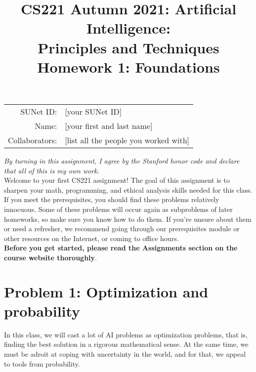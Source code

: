 \documentclass{article}
\title{\textbf{CS221 Autumn 2021: Artificial Intelligence:\\ Principles and Techniques} \\Homework 1: Foundations}
\date{}
\theoremstyle{case}
\theoremstyle{definition}
\begin{document}
\maketitle

\begin{center}
\begin{tabular}{rl}
SUNet ID: & [your SUNet ID] \\
Name: & [your first and last name] \\
Collaborators: & [list all the people you worked with]
\end{tabular}
\end{center}

\textit{By turning in this assignment, I agree by the Stanford honor code and declare
that all of this is my own work.} \\

Welcome to your first CS221 assignment! The goal of this assignment is to sharpen your math, programming, and ethical analysis skills needed for this class. If you meet the prerequisites, you should find these problems relatively innocuous. Some of these problems will occur again as subproblems of later homeworks, so make sure you know how to do them. If you're unsure about them or need a refresher, we recommend going through our prerequisites module or other resources on the Internet, or coming to office hours.\\

\textbf{Before you get started, please read the Assignments section on the course website thoroughly}.


\section*{Problem 1: Optimization and probability}

In this class, we will cast a lot of AI problems as optimization problems, that is, finding the best solution in a rigorous mathematical sense.
At the same time, we must be adroit at coping with uncertainty in the world, and for that, we appeal to tools from probability.
\end{document}
